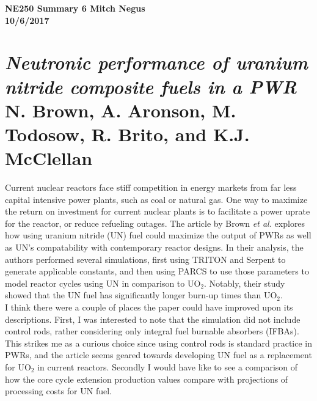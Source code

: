 \documentclass{report}
\newcommand{\tab}{\-\hspace{1cm}}
\begin{document}
\thispagestyle{empty}

{\bf {\large {NE250 Summary {6} \hfill Mitch Negus\\
		\hspace*{\fill} 10/6/2017\\ }}}
\section*{\textsl{Neutronic performance of uranium nitride composite fuels in a PWR} \\ \normalsize N. Brown, A. Aronson, M. Todosow, R. Brito, and K.J. McClellan}

\tab Current nuclear reactors face stiff competition in energy markets from far less capital intensive power plants, such as coal or natural gas. One way to maximize the return on investment for current nuclear plants is to facilitate a power uprate for the reactor, or reduce refueling outages. The article by Brown \textit{et al.} explores how using uranium nitride (UN) fuel could maximize the output of PWRs as well as UN's compatability with contemporary reactor designs. In their analysis, the authors performed several simulations, first using TRITON and Serpent to generate applicable constants, and then using PARCS to use those parameters to model reactor cycles using UN in comparison to UO$_2$. Notably, their study showed that the UN fuel has significantly longer burn-up times than UO$_2$. \\
\tab I think there were a couple of places the paper could have improved upon its descriptions. First, I was interested to note that the simulation did not include control rods, rather considering only integral fuel burnable absorbers (IFBAs). This strikes me as a curious choice since using control rods is standard practice in PWRs, and the article seems geared towards developing UN fuel as a replacement for UO$_2$ in current reactors. Secondly I would have like to see a comparison of how the core cycle extension production values compare with projections of processing costs for UN fuel. 
\end{document}
